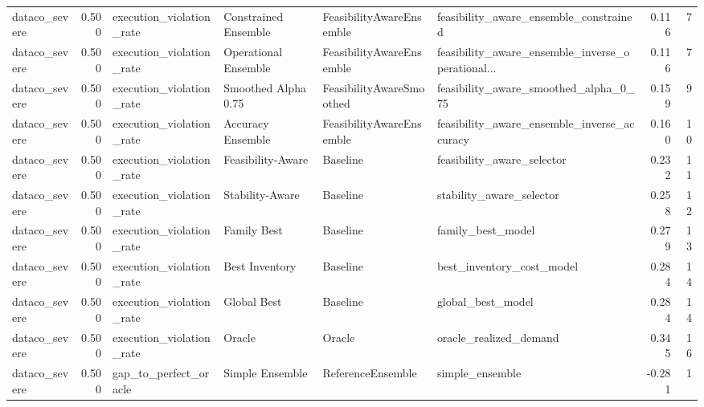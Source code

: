 \begin{table}
{\begin{tabular}{lrllllrr}
 dataco\_severe &             0.500 &    execution\_violation\_rate &  Constrained Ensemble &  FeasibilityAwareEnsemble &             feasibility\_aware\_ensemble\_constrained &         0.116 &               7 \\
 dataco\_severe &             0.500 &    execution\_violation\_rate &  Operational Ensemble &  FeasibilityAwareEnsemble &  feasibility\_aware\_ensemble\_inverse\_operational... &         0.116 &               7 \\
 dataco\_severe &             0.500 &    execution\_violation\_rate &   Smoothed Alpha 0.75 &  FeasibilityAwareSmoothed &              feasibility\_aware\_smoothed\_alpha\_0\_75 &         0.159 &               9 \\
 dataco\_severe &             0.500 &    execution\_violation\_rate &     Accuracy Ensemble &  FeasibilityAwareEnsemble &        feasibility\_aware\_ensemble\_inverse\_accuracy &         0.160 &              10 \\
 dataco\_severe &             0.500 &    execution\_violation\_rate &     Feasibility-Aware &                  Baseline &                         feasibility\_aware\_selector &         0.232 &              11 \\
 dataco\_severe &             0.500 &    execution\_violation\_rate &       Stability-Aware &                  Baseline &                           stability\_aware\_selector &         0.258 &              12 \\
 dataco\_severe &             0.500 &    execution\_violation\_rate &           Family Best &                  Baseline &                                  family\_best\_model &         0.279 &              13 \\
 dataco\_severe &             0.500 &    execution\_violation\_rate &        Best Inventory &                  Baseline &                          best\_inventory\_cost\_model &         0.284 &              14 \\
 dataco\_severe &             0.500 &    execution\_violation\_rate &           Global Best &                  Baseline &                                  global\_best\_model &         0.284 &              14 \\
 dataco\_severe &             0.500 &    execution\_violation\_rate &                Oracle &                    Oracle &                             oracle\_realized\_demand &         0.345 &              16 \\
 dataco\_severe &             0.500 &       gap\_to\_perfect\_oracle &       Simple Ensemble &         ReferenceEnsemble &                                    simple\_ensemble &        -0.281 &               1 \\

\end{tabular}}
\end{table}
